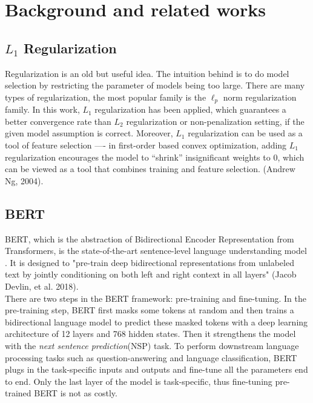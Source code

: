\documentclass{article}
\begin{document}
\section{Background and related works}

\subsection{$L_1$ Regularization}
Regularization is an old but useful idea. The intuition behind is to do model
selection by restricting the parameter of models being too large. There are
many types of regularization, the most popular family is the $\ell_p$ norm 
regularization family. In this work, $L_1$ regularization has been applied,
which guarantees a better convergence rate than $L_2$ regularization or
non-penalization setting, if the given model assumption is correct. Moreover,
$L_1$ regularization can be used as a tool of feature selection ---- in 
first-order based convex optimization, adding $L_1$ regularization 
encourages the model to ``shrink'' insignificant weights to 0, which can be
viewed as a tool that combines training and feature selection. (Andrew Ng,
2004)\cite{1}.

\subsection{BERT}
BERT, which is the abstraction of Bidirectional Encoder Representation from Transformers, is the state-of-the-art sentence-level language understanding model . It is designed to "pre-train deep bidirectional representations from unlabeled text by jointly conditioning on both left and right context in all layers" (Jacob Devlin, et al. 2018)\cite{2}. \\

There are two steps in the BERT framework: pre-training and fine-tuning. In the pre-training step, BERT first masks some tokens at random and then trains a bidirectional language model to predict these masked tokens with a deep learning architecture of 12 layers and 768 hidden states. Then it strengthens the model with the \textit{next sentence prediction}(NSP) task. To perform downstream language processing tasks such as question-answering and language classification, BERT plugs in the task-specific inputs and outputs and fine-tune all the parameters end to end. Only the last layer of the model is task-specific, thus fine-tuning pre-trained BERT is not as costly.\cite{2}\\
\end{document}
